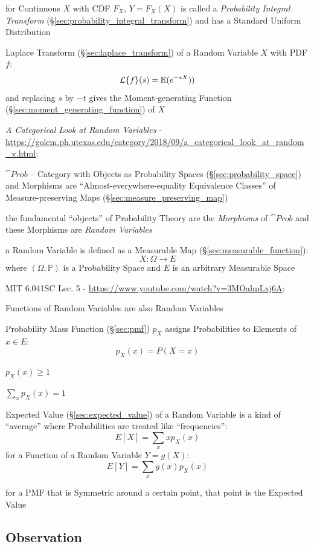 for Continuous $X$ with CDF $F_X$, $Y = F_X(X)$ is called a \emph{Probability
  Integral Transform} (\S\ref{sec:probability_integral_transform}) and has a
Standard Uniform Distribution

Laplace Transform (\S\ref{sec:laplace_transform}) of a Random Variable $X$ with
PDF $f$:
\[
  \mathcal{L}\{f\}(s) = \mathbb{E}(e^{-sX}))
\]
and replacing $s$ by $-t$ gives the Moment-generating Function
(\S\ref{sec:moment_generating_function}) of $X$

\asterism

\emph{A Categorical Look at Random Variables} -
\url{https://golem.ph.utexas.edu/category/2018/09/a_categorical_look_at_random_v.html}:

$\cat{Prob}$ -- Category with Objects as Probability Spaces
(\S\ref{sec:probability_space}) and Morphisms are ``Almost-everywhere-equality
Equivalence Classes'' of Measure-preserving Maps
(\S\ref{sec:measure_preserving_map})

the fundamental ``objects'' of Probability Theory are the \emph{Morphisms} of
$\cat{Prob}$ and these Morphisms are \emph{Random Variables}

a Random Variable is defined as a Measurable Map
(\S\ref{sec:measurable_function}):
\[
  X : \Omega \to E
\]
where $(\Omega,\mathbb{P})$ is a Probability Space and $E$ is an arbitrary
Measurable Space

\asterism

MIT 6.041SC Lec. 5 - \url{https://www.youtube.com/watch?v=3MOahpLxj6A}:

Functions of Random Variables are also Random Variables

Probability Mass Function (\S\ref{sec:pmf}) $p_X$ assigns
Probabilities to Elements of $x \in E$:
\[
  p_X(x) = P(X = x)
\]

$p_X(x) \geq 1$

$\sum_x p_X(x) = 1$

Expected Value (\S\ref{sec:expected_value}) of a Random Variable is a kind of
``average'' where Probabilities are treated like ``frequencies'':
\[
  E[X] = \sum_x xp_X(x)
\]
for a Function of a Random Variable $Y = g(X)$:
\[
  E[Y] = \sum_x g(x)p_X(x)
\]

for a PMF that is Symmetric around a certain point, that point is the Expected
Value



\subsection{Observation}\label{sec:observation}

